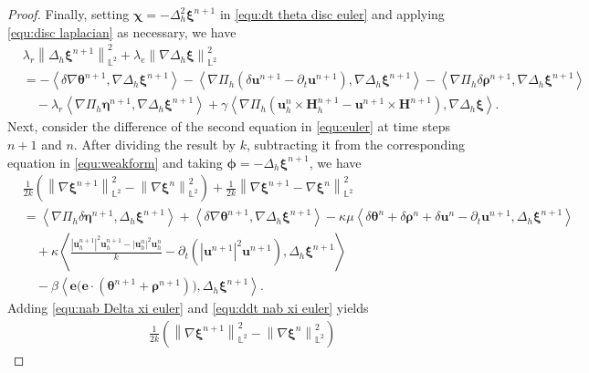 \documentclass[11pt, reqno]{amsart}
\theoremstyle{definition}
\theoremstyle{remark}
\numberwithin{equation}{section}
\newcommand{\bff}{\boldsymbol}
\newcommand{\bb}{\mathbb}
\newcommand{\norm}[2]{\left\|{#1}\right\|_{#2}}
\newcommand{\inpro}[2]{\left\langle#1,#2\right\rangle}
\newcommand{\abs}[1]{\left|{#1}\right|}
\begin{document}
\begin{proof}
	Finally, setting $\bff{\chi}=-\Delta_h^2 \bff{\xi}^{n+1}$ in \eqref{equ:dt theta disc euler} and applying \eqref{equ:disc laplacian} as necessary, we have
	\begin{align}\label{equ:nab Delta xi euler}
		\nonumber
		&\lambda_r \norm{\Delta_h \bff{\xi}^{n+1}}{\bb{L}^2}^2
		+
		\lambda_e \norm{\nabla \Delta_h \bff{\xi}}{\bb{L}^2}^2
		\\
		\nonumber
		&=
		-
		\inpro{\delta\nabla \bff{\theta}^{n+1}}{\nabla \Delta_h \bff{\xi}^{n+1}}
		-
		\inpro{\nabla \Pi_h \left(\delta \bff{u}^{n+1}-\partial_t \bff{u}^{n+1}\right)}{\nabla \Delta_h \bff{\xi}^{n+1}}
		-
		\inpro{\nabla \Pi_h \delta \bff{\rho}^{n+1}}{\nabla \Delta_h \bff{\xi}^{n+1}}
		\\
		&\quad
		-
		\lambda_r \inpro{\nabla \Pi_h \bff{\eta}^{n+1}}{\nabla \Delta_h \bff{\xi}^{n+1}}
		+
		\gamma \inpro{\nabla \Pi_h(\bff{u}_h^n \times \bff{H}_h^{n+1} - \bff{u}^{n+1} \times \bff{H}^{n+1})}{\nabla \Delta_h \bff{\xi}}.
	\end{align}
	Next, consider the difference of the second equation in \eqref{equ:euler} at time steps $n+1$ and $n$. After dividing the result by $k$, subtracting it from the corresponding equation in \eqref{equ:weakform} and taking $\bff{\phi}=-\Delta_h \bff{\xi}^{n+1}$, we have
	\begin{align}\label{equ:ddt nab xi euler}
		\nonumber
		&\frac{1}{2k} \left(\norm{\nabla \bff{\xi}^{n+1}}{\bb{L}^2}^2 - \norm{\nabla \bff{\xi}^n}{\bb{L}^2}^2 \right)
		+
		\frac{1}{2k} \norm{\nabla \bff{\xi}^{n+1}-\nabla \bff{\xi}^n}{\bb{L}^2}^2
		\\
		\nonumber
		&=
		\inpro{\nabla \Pi_h \delta \bff{\eta}^{n+1}}{\Delta_h \bff{\xi}^{n+1}}
		+
		\inpro{\delta \nabla \bff{\theta}^{n+1}}{\nabla \Delta_h \bff{\xi}^{n+1}}
		-
		\kappa \mu\inpro{\delta \bff{\theta}^n+\delta \bff{\rho}^n+\delta \bff{u}^n-\partial_t \bff{u}^{n+1}}{\Delta_h \bff{\xi}^{n+1}}
		\\
		&\quad
		+
		\kappa \inpro{\frac{\abs{\bff{u}_h^{n+1}}^2 \bff{u}_h^{n+1} - \abs{\bff{u}_h^n}^2 \bff{u}_h^n}{k} - \partial_t \left(\abs{\bff{u}^{n+1}}^2 \bff{u}^{n+1}\right)}{\Delta_h \bff{\xi}^{n+1}}
		\nonumber \\
		&\quad
		-
		\beta\inpro{\bff{e}\big( \bff{e}\cdot(\bff{\theta}^{n+1}+\bff{\rho}^{n+1})\big)}{\Delta_h \bff{\xi}^{n+1}}.
	\end{align}
	Adding \eqref{equ:nab Delta xi euler} and \eqref{equ:ddt nab xi euler} yields
	\begin{align*}
		&\frac{1}{2k} \left(\norm{\nabla \bff{\xi}^{n+1}}{\bb{L}^2}^2 - \norm{\nabla \bff{\xi}^n}{\bb{L}^2}^2 \right)

\end{align*}
\end{proof}
\end{document}
